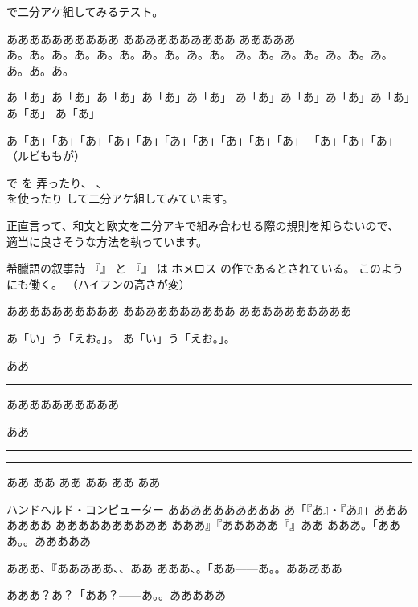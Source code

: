 \documentclass[12pt,landscape]{ltjtarticle}
\begin{document}

で二分アケ組してみるテスト。

ああああああああああ
あああああああああ\allowbreak あ
あああああ\\
あ。あ。あ。あ。あ。あ。あ。あ。あ。あ。
あ。あ。あ。あ。あ。あ。あ。あ。あ。あ。

あ「あ」あ「あ」あ「あ」あ「あ」あ「あ」
あ「あ」あ「あ」あ「あ」あ「あ」あ「あ」
あ「あ」

あ「あ」「あ」「あ」「あ」「あ」「あ」「あ」「あ」「あ」「あ」
「あ」「あ」「あ」（ルビももが）

で
を
弄ったり、
、\\
を使ったり
して二分アケ組してみています。

正直言って、和文と欧文を二分アキで組み合わせる際の規則を知らないので、
適当に良さそうな方法を執っています。


希臘語の叙事詩
『』%
と
『』%
は
ホメロス%
の作であるとされている。
このようにも働く。
（ハイフンの高さが変）


ああああああああああ%
ああああああああああ%
ああああああああああ%

あ「い」う「えお。」。
あ「い」う「えお。」。

ああ\rule{\zw}{1pt}%
ああああああああああ

ああ\rule{\intcalcShr{\zw} sp}{1pt}\rule{\intcalcSub{\zw}{\intcalcShr{\zw}} sp}{1pt}%
ああ\sibuNoalign{}%
ああ%
ああ%
ああ%
ああ%
ああ%

ハンドヘルド・コンピューター
ああああああああああ
あ「『あ』・『あ』」あああああああ
ああああああああああ
あああ』『あああああ『』ああ
あああ。「あああ。。あああああ

あああ、『あああああ、、ああ
あああ、。「ああ——あ。。あああああ

あああ？あ？「ああ？——あ。。あああああ
\end{document}
